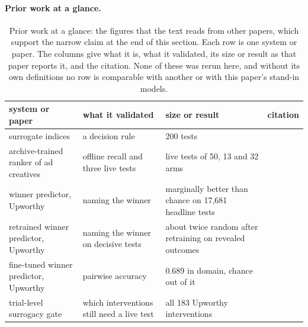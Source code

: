 \iftmlr\paragraph{Prior work at a glance.}\fi
\label{sec:prior-glance}
\begin{table}[t]\centering\scriptsize
\caption{Prior work at a glance: the figures that the text reads from other papers, which support the narrow claim at the end of this section. Each row is one system or paper. The columns give what it is, what it validated, its size or result as that paper reports it, and the citation. None of these was rerun here, and without its own definitions no row is comparable with another or with this paper's stand-in models.}
\label{tab:fmt-prior-work}
\begin{tabular}{p{}p{}p{}l}
\toprule
system or paper & what it validated & size or result & citation \\
\midrule
surrogate indices & a decision rule & 200 tests & \cite{zhang2023evaluating} \\
archive-trained ranker of ad creatives & offline recall and three live tests & live tests of 50, 13 and 32 arms & \cite{lee2026offline} \\
winner predictor, Upworthy & naming the winner & marginally better than chance on 17,681 headline tests & \cite{ye2025lola} \\
retrained winner predictor, Upworthy & naming the winner on decisive tests & about twice random after retraining on revealed outcomes & \cite{clark2026predict} \\
fine-tuned winner predictor, Upworthy & pairwise accuracy & 0.689 in domain, chance out of it & \cite{khimani2026finetuning} \\
trial-level surrogacy gate & which interventions still need a live test & all 183 Upworthy interventions & \cite{schultzberg2026when} \\

\end{tabular}
\end{table}
